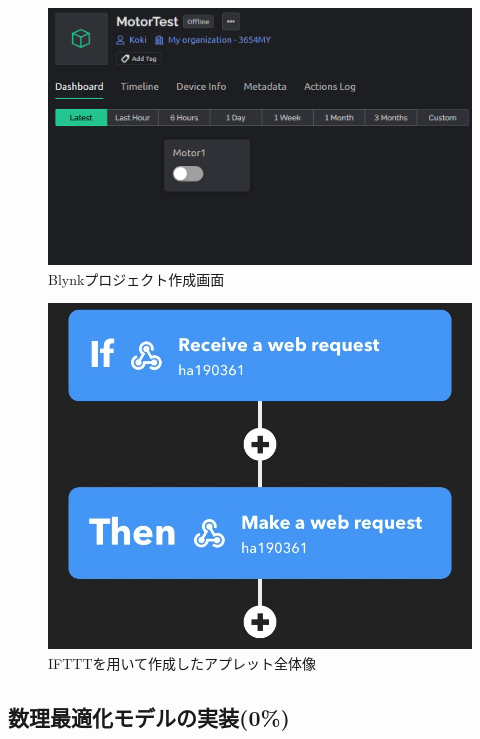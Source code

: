       \begin{figure}[htbp]
        \centering
        \includegraphics[scale=0.25]
        {figures/BlynkProject.png}
        \caption{Blynkプロジェクト作成画面}
        \label{fig:Blynkプロジェクト作成画面}
      \end{figure}
      
      \begin{figure}[htbp]
        \centering
        \includegraphics[scale=0.27]
        {figures/IFTTT-overall.jpg}
        \caption{IFTTTを用いて作成したアプレット全体像}
        \label{fig:IFTTTを用いて作成したアプレット全体像}
      \end{figure}
          
  \subsection{数理最適化モデルの実装(0\%)}
    \label{sec:数理最適化モデルの実装}
      \par
      
